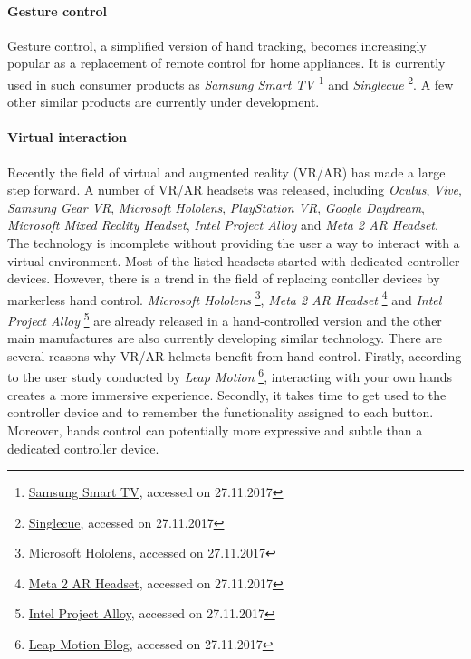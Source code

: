 \paragraph{Gesture control} Gesture control, a simplified version of hand tracking, becomes increasingly popular as a replacement of remote control for home appliances. It is currently used in such consumer products as 
%
\textit{Samsung Smart TV}
\footnote{\href{http://www.samsung.com/ph/smarttv/motion_control.html}{Samsung Smart TV}, accessed on 27.11.2017}
%
 and \textit{Singlecue}
 \footnote{\href{https://singlecue.com/}{Singlecue}, accessed on 27.11.2017}.
%
 A few other similar products are currently under development.

\paragraph{Virtual interaction} Recently the field of virtual and augmented reality (VR/AR) has made a large step forward. A number of VR/AR headsets was released, including 
\textit{Oculus}, \textit{Vive}, \textit{Samsung Gear VR}, \textit{Microsoft Hololens}, \textit{PlayStation VR}, \textit{Google Daydream}, \textit{Microsoft Mixed Reality Headset}, \textit{Intel Project Alloy} and \textit{Meta 2 AR Headset}. The technology is incomplete without providing the user a way to interact with a virtual environment. Most of the listed headsets started with dedicated controller devices. However, there is a trend in the field of replacing contoller devices by markerless hand control.
%
\textit{Microsoft Hololens}
\footnote{\href{https://www.microsoft.com/en-us/hololens}{Microsoft Hololens}, accessed on 27.11.2017},
%
\textit{Meta 2 AR Headset}
\footnote{\href{https://www.metavision.com/}{Meta 2 AR Headset}, accessed on 27.11.2017} and
%
\textit{Intel Project Alloy} 
\footnote{\href{https://newsroom.intel.com/press-kits/project-alloy/}{Intel Project Alloy}, accessed on 27.11.2017}
%
are already released in a hand-controlled version and the other main manufactures are also currently developing similar technology.
There are several reasons why VR/AR helmets benefit from hand control. Firstly, according to the user study conducted by 
%
\textit{Leap Motion}
\footnote{\href{http://blog.leapmotion.com/image-hands-bring-your-own-hands-into-virtual-reality/}{Leap Motion Blog}, accessed on 27.11.2017},
%
interacting with your own hands creates a more immersive experience. Secondly, it takes time to get used to the controller device and to remember the functionality assigned to each button. Moreover, hands control can potentially more expressive and subtle than a dedicated controller device.


